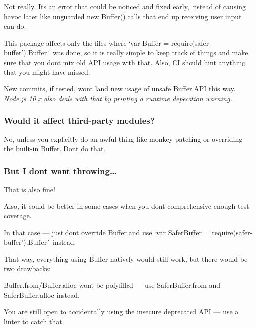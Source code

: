 Not really. It\textquotesingle{}s an error that could be noticed and fixed early, instead of causing havoc later like unguarded {\ttfamily new Buffer()} calls that end up receiving user input can do.

This package affects only the files where `var Buffer = require(\textquotesingle{}safer-\/buffer').Buffer\`{} was done, so it is really simple to keep track of things and make sure that you don\textquotesingle{}t mix old A\+PI usage with that. Also, CI should hint anything that you might have missed.

New commits, if tested, won\textquotesingle{}t land new usage of unsafe Buffer A\+PI this way. {\itshape Node.\+js 10.\+x also deals with that by printing a runtime depecation warning.}

\subsubsection*{Would it affect third-\/party modules?}

No, unless you explicitly do an awful thing like monkey-\/patching or overriding the built-\/in {\ttfamily Buffer}. Don\textquotesingle{}t do that.

\subsubsection*{But I don\textquotesingle{}t want throwing…}

That is also fine!

Also, it could be better in some cases when you don\textquotesingle{}t comprehensive enough test coverage.

In that case — just don\textquotesingle{}t override {\ttfamily Buffer} and use `var Safer\+Buffer = require(\textquotesingle{}safer-\/buffer').Buffer\`{} instead.

That way, everything using {\ttfamily Buffer} natively would still work, but there would be two drawbacks\+:


\begin{DoxyItemize}
\item {\ttfamily Buffer.\+from}/{\ttfamily Buffer.\+alloc} won\textquotesingle{}t be polyfilled — use {\ttfamily Safer\+Buffer.\+from} and {\ttfamily Safer\+Buffer.\+alloc} instead.
\item You are still open to accidentally using the insecure deprecated A\+PI — use a linter to catch that.
\end{DoxyItemize}

